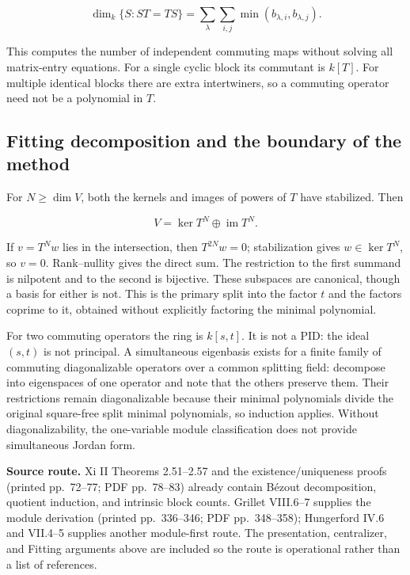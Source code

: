 \documentclass[
  11pt,
]{article}
\begin{document}
\[\dim_k\{S:ST=TS\}
=\sum_\lambda\sum_{i,j}\min(b_{\lambda,i},b_{\lambda,j}).\]

This computes the number of independent commuting maps without solving
all matrix-entry equations. For a single cyclic block its commutant is
\(k[T]\). For multiple identical blocks there are extra intertwiners, so
a commuting operator need not be a polynomial in \(T\).

\subsection{Fitting decomposition and the boundary of the
method}\label{fitting-decomposition-and-the-boundary-of-the-method}

For \(N\ge\dim V\), both the kernels and images of powers of \(T\) have
stabilized. Then

\[V=\ker T^N\oplus\operatorname{im}T^N.\]

If \(v=T^Nw\) lies in the intersection, then \(T^{2N}w=0\);
stabilization gives \(w\in\ker T^N\), so \(v=0\). Rank--nullity gives
the direct sum. The restriction to the first summand is nilpotent and to
the second is bijective. These subspaces are canonical, though a basis
for either is not. This is the primary split into the factor \(t\) and
the factors coprime to it, obtained without explicitly factoring the
minimal polynomial.

For two commuting operators the ring is \(k[s,t]\). It is not a PID: the
ideal \((s,t)\) is not principal. A simultaneous eigenbasis exists for a
finite family of commuting diagonalizable operators over a common
splitting field: decompose into eigenspaces of one operator and note
that the others preserve them. Their restrictions remain diagonalizable
because their minimal polynomials divide the original square-free split
minimal polynomials, so induction applies. Without diagonalizability,
the one-variable module classification does not provide simultaneous
Jordan form.

\textbf{Source route.} Xi II Theorems 2.51--2.57 and the
existence/uniqueness proofs (printed pp.~72--77; PDF pp.~78--83) already
contain Bézout decomposition, quotient induction, and intrinsic block
counts. Grillet VIII.6--7 supplies the module derivation (printed
pp.~336--346; PDF pp.~348--358); Hungerford IV.6 and VII.4--5 supplies
another module-first route. The presentation, centralizer, and Fitting
arguments above are included so the route is operational rather than a
list of references.
\end{document}
